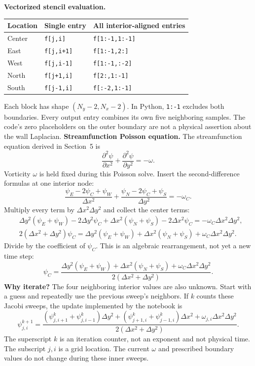 \textbf{Vectorized stencil evaluation.}
\begin{center}\begin{tabular}{lll}\toprule
Location & Single entry & All interior-aligned entries\\\midrule
Center & \texttt{f[j,i]} & \texttt{f[1:-1,1:-1]}\\
East & \texttt{f[j,i+1]} & \texttt{f[1:-1,2:]}\\
West & \texttt{f[j,i-1]} & \texttt{f[1:-1,:-2]}\\
North & \texttt{f[j+1,i]} & \texttt{f[2:,1:-1]}\\
South & \texttt{f[j-1,i]} & \texttt{f[:-2,1:-1]}\\\bottomrule
\end{tabular}\end{center}
Each block has shape $(N_y-2,N_x-2)$. In Python, \texttt{1:-1} excludes both boundaries. Every output entry combines its own five neighboring samples. The code's zero placeholders on the outer boundary are not a physical assertion about the wall Laplacian.
\newpage
{}\label{sec:fd-system}
\textbf{Streamfunction Poisson equation.} The streamfunction equation derived in Section~5 is
\[
\frac{\partial^2\psi}{\partial x^2}+\frac{\partial^2\psi}{\partial y^2}=-\omega.
\]
Vorticity $\omega$ is held fixed during this Poisson solve. Insert the second-difference formulas at one interior node:
\[
\frac{\psi_E-2\psi_C+\psi_W}{\Delta x^2}
+\frac{\psi_N-2\psi_C+\psi_S}{\Delta y^2}=-\omega_C.
\]
Multiply every term by $\Delta x^2\Delta y^2$ and collect the center terms:
\begin{align*}
&\Delta y^2(\psi_E+\psi_W)-2\Delta y^2\psi_C
+\Delta x^2(\psi_N+\psi_S)-2\Delta x^2\psi_C
=-\omega_C\Delta x^2\Delta y^2,\\
&2(\Delta x^2+\Delta y^2)\psi_C
=\Delta y^2(\psi_E+\psi_W)+\Delta x^2(\psi_N+\psi_S)
+\omega_C\Delta x^2\Delta y^2.
\end{align*}
Divide by the coefficient of $\psi_C$. This is an algebraic rearrangement, not yet a new time step:
\[
\psi_C=\frac{\Delta y^2(\psi_E+\psi_W)+\Delta x^2(\psi_N+\psi_S)
+\omega_C\Delta x^2\Delta y^2}{2(\Delta x^2+\Delta y^2)}.
\]
\textbf{Why iterate?} The four neighboring interior values are also unknown. Start with a guess and repeatedly use the previous sweep's neighbors. If $k$ counts these Jacobi sweeps, the update implemented by the notebook is
\begin{equation}
\psi_{j,i}^{k+1}=\frac{(\psi^k_{j,i+1}+\psi^k_{j,i-1})\Delta y^2
+(\psi^k_{j+1,i}+\psi^k_{j-1,i})\Delta x^2
+\omega_{j,i}\Delta x^2\Delta y^2}{2(\Delta x^2+\Delta y^2)}.
\label{eq:jacobi-expanded}
\end{equation}
The superscript $k$ is an iteration counter, not an exponent and not physical time. The subscript $j,i$ is a grid location. The current $\omega$ and prescribed boundary values do not change during these inner sweeps.

